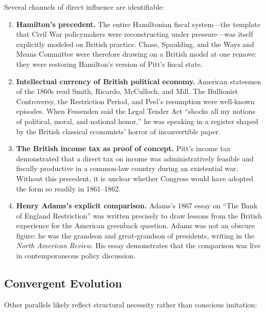 \documentclass[12pt]{article}
\begin{document}
Several channels of direct influence are identifiable:

\begin{enumerate}
\item \textbf{Hamilton's precedent.} The entire Hamiltonian fiscal
  system---the template that Civil War policymakers were reconstructing
  under pressure---was itself explicitly modeled on British practice.
  Chase, Spaulding, and the Ways and Means Committee were therefore
  drawing on a British model at one remove: they were restoring
  Hamilton's version of Pitt's fiscal state.

\item \textbf{Intellectual currency of British political economy.}
  American statesmen of the 1860s read Smith, Ricardo, McCulloch, and
  Mill. The Bullionist Controversy, the Restriction Period, and Peel's
  resumption were well-known episodes. When Fessenden said the Legal
  Tender Act ``shocks all my notions of political, moral, and national
  honor,'' he was speaking in a register shaped by the British classical
  economists' horror of inconvertible paper.

\item \textbf{The British income tax as proof of concept.} Pitt's income
  tax demonstrated that a direct tax on income was administratively
  feasible and fiscally productive in a common-law country during an
  existential war. Without this precedent, it is unclear whether
  Congress would have adopted the form so readily in 1861--1862.

\item \textbf{Henry Adams's explicit comparison.} Adams's 1867 essay on
  ``The Bank of England Restriction'' was written precisely to draw
  lessons from the British experience for the American greenback
  question. Adams was not an obscure figure: he was the grandson and
  great-grandson of presidents, writing in the \textit{North American
  Review}. His essay demonstrates that the comparison was live in
  contemporaneous policy discussion.
\end{enumerate}

\subsection{Convergent Evolution}

Other parallels likely reflect structural necessity rather than
conscious imitation:
\end{document}
